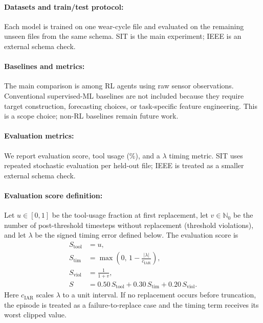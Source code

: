 \documentclass[sn-basic]{sn-jnl}%
\begin{document}
\paragraph{Datasets and train/test protocol:}
Each model is trained on one wear-cycle file and evaluated on the remaining unseen files from the same schema. SIT is the main experiment; IEEE is an external schema check.

\paragraph{Baselines and metrics:}
\label{sec:metrics}
The main comparison is among RL agents using raw sensor observations. Conventional supervised-ML baselines are not included because they require target construction, forecasting choices, or task-specific feature engineering. This is a scope choice; non-RL baselines remain future work.

\paragraph{Evaluation metrics:}
We report evaluation score, tool usage (\%), and a $\lambda$ timing metric. SIT uses repeated stochastic evaluation per held-out file; IEEE is treated as a smaller external schema check.

\paragraph{Evaluation score definition:}
Let $u\in[0,1]$ be the tool-usage fraction at first replacement, let $v\in\mathbb{N}_0$ be the number of post-threshold timesteps without replacement (threshold violations), and let $\lambda$ be the signed timing error defined below. The evaluation score is
\begin{align}
	S_{\text{tool}} &= u,\\
	S_{\text{tim}} &= \max\left(0,\,1-\frac{|\lambda|}{c_{\mathrm{IAR}}}\right),\\
	S_{\text{viol}} &= \frac{1}{1+v},\\
	S &= 0.50\,S_{\text{tool}} + 0.30\,S_{\text{tim}} + 0.20\,S_{\text{viol}}.
\end{align}
Here $c_{\mathrm{IAR}}$ scales $\lambda$ to a unit interval. If no replacement occurs before truncation, the episode is treated as a failure-to-replace case and the timing term receives its worst clipped value.

\end{document}
